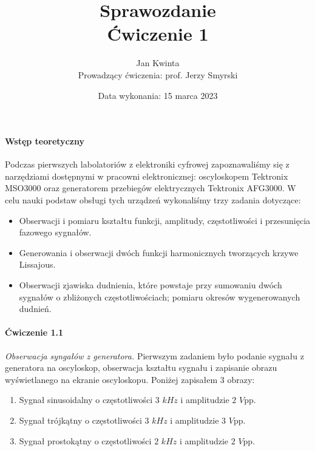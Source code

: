 \documentclass[14pt, table]{extarticle}
\title{\textbf{Sprawozdanie} \\ \Large{Ćwiczenie 1}}
\date{Data wykonania: 15 marca 2023}
\author{ \Large{Jan Kwinta} \\ \large{Prowadzący ćwiczenia: prof. Jerzy Smyrski}}
\begin{document}
\maketitle

\paragraph{Wstęp teoretyczny \\}
Podczas pierwszych labolatoriów z elektroniki cyfrowej zapoznawaliśmy się z narzędziami dostępnymi w pracowni elektronicznej: oscyloskopem Tektronix MSO3000 oraz generatorem przebiegów elektrycznych Tektronix AFG3000. W celu nauki podstaw obsługi tych urządzeń wykonaliśmy trzy zadania dotyczące:

\begin{itemize}
    \item Obserwacji i pomiaru kształtu funkcji, amplitudy, częstotliwości i przesunięcia fazowego sygnałów.
    \item Generowania i obserwacji dwóch funkcji harmonicznych tworzących krzywe Lissajous.
    \item Obserwacji zjawiska dudnienia, które powstaje przy sumowaniu dwóch sygnałów o zbliżonych częstotliwościach; pomiaru okresów wygenerowanych dudnień.
\end{itemize}

\newpage
\paragraph{Ćwiczenie 1.1 \\}
\textit{Obserwacja syngałów z generatora.} Pierwszym zadaniem było podanie sygnału z generatora na oscyloskop, obserwacja kształtu sygnału i zapisanie obrazu wyświetlanego na ekranie oscyloskopu. Poniżej zapisałem 3 obrazy: 

\begin{enumerate}
    \item Sygnał sinusoidalny o częstotliwości $3$ $kHz$ i amplitudzie $2$ $V$pp.
    \item Sygnał trójkątny o częstotliwości $3$ $kHz$ i amplitudzie $3$ $V$pp.
    \item Sygnał prostokątny o częstotliwości $2$ $kHz$ i amplitudzie $2$ $V$pp.
\end{enumerate}
\end{document}

